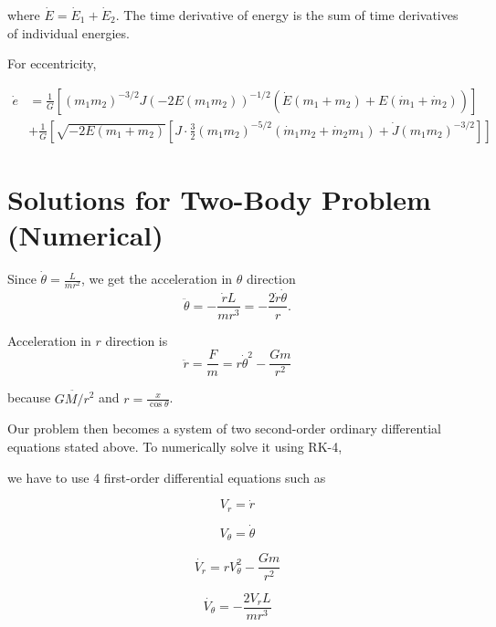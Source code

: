 \documentclass{article}
\begin{document}
where $\dot E = \dot E_1 + \dot E_2$. The time derivative of energy is the sum of time derivatives of individual energies.

For eccentricity,

\begin{equation}
    \begin{split}
        \dot e
        & = \frac{1}{G} \left[(m_1m_2)^{-3/2} J (-2E(m_1m_2))^{-1/2} (\dot E (m_1 + m_2) + E(\dot m_1 + \dot m_2)) \right] \\
        & + \frac{1}{G} \left[ \sqrt{-2E(m_1 + m_2)} \left[ J \cdot \frac{3}{2} (m_1m_2)^{-5/2} (\dot m_1 m_2 + \dot m_2 m_1) + \dot J (m_1m_2)^{-3/2}\right]\right]
    \end{split}
\end{equation}



\section{Solutions for Two-Body Problem (Numerical)}

Since $\dot{\theta} = \frac{L}{mr^2}$, we get the acceleration in $\theta$ direction
\begin{equation}
    \ddot{\theta} = - \frac{\dot{r} L}{mr^3} = -\frac{2\dot{r}\dot{\theta}}{r}.
\end{equation}

Acceleration in $r$ direction is
\begin{equation}
    \ddot{r} = \frac{F}{m} = r \dot{\theta}^2 - \frac{Gm}{r^2}
\end{equation}

because $\ddot{GM/r^2}$ and $r = \frac{x}{\cos{\theta}}$.

Our problem then becomes a system of two second-order ordinary differential equations stated above.
To numerically solve it using RK-4,

we have to use 4 first-order differential equations such as 

\begin{equation}
    V_r = \dot{r}
\end{equation}

\begin{equation}
    V_\theta = \dot{\theta}
\end{equation}

\begin{equation}
    \dot{V_r} = r V_\theta ^2 - \frac{Gm}{r^2}
\end{equation}

\begin{equation}
    \dot{V_\theta} = - \frac{2V_r L}{mr^3} 
\end{equation}
\end{document}
